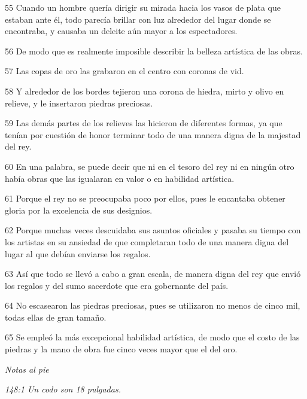 \par 55 Cuando un hombre quería dirigir su mirada hacia los vasos de plata que estaban ante él, todo parecía brillar con luz alrededor del lugar donde se encontraba, y causaba un deleite aún mayor a los espectadores.

\par 56 De modo que es realmente imposible describir la belleza artística de las obras.

\par 57 Las copas de oro las grabaron en el centro con coronas de vid.

\par 58 Y alrededor de los bordes tejieron una corona de hiedra, mirto y olivo en relieve, y le insertaron piedras preciosas.

\par 59 Las demás partes de los relieves las hicieron de diferentes formas, ya que tenían por cuestión de honor terminar todo de una manera digna de la majestad del rey.

\par 60 En una palabra, se puede decir que ni en el tesoro del rey ni en ningún otro había obras que las igualaran en valor o en habilidad artística.

\par 61 Porque el rey no se preocupaba poco por ellos, pues le encantaba obtener gloria por la excelencia de sus designios.

\par 62 Porque muchas veces descuidaba sus asuntos oficiales y pasaba su tiempo con los artistas en su ansiedad de que completaran todo de una manera digna del lugar al que debían enviarse los regalos.

\par 63 Así que todo se llevó a cabo a gran escala, de manera digna del rey que envió los regalos y del sumo sacerdote que era gobernante del país.

\par 64 No escasearon las piedras preciosas, pues se utilizaron no menos de cinco mil, todas ellas de gran tamaño.

\par 65 Se empleó la más excepcional habilidad artística, de modo que el costo de las piedras y la mano de obra fue cinco veces mayor que el del oro.

\par \textit{Notas al pie}

\par \textit{148:1 Un codo son 18 pulgadas.}

